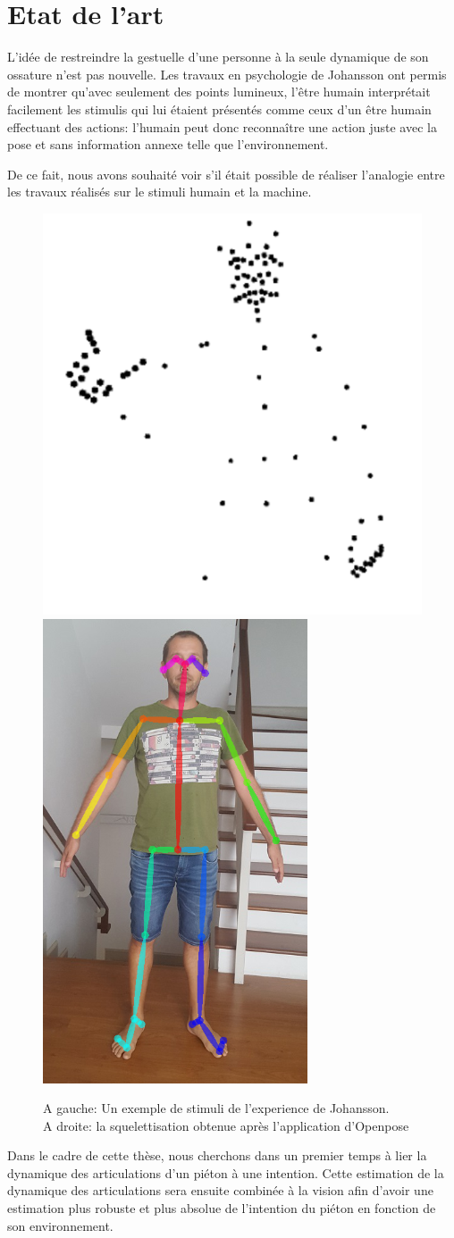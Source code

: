 \chapter{Etat de l'art}
\label{sec:SOTA}

L'idée de restreindre la gestuelle d'une personne à la seule dynamique de son ossature n'est pas nouvelle.
Les travaux en psychologie de Johansson  \cite{johansson1973visual,johansson1976spatio} ont permis de montrer qu'avec seulement des points lumineux, l'être humain interprétait facilement les stimulis qui lui étaient présentés comme ceux d'un être humain effectuant des actions: l'humain peut donc reconnaître une action juste avec la pose et sans information annexe telle que l'environnement. 

De ce fait, nous avons souhaité voir s'il était possible de réaliser l'analogie entre les travaux réalisés sur le stimuli humain et la machine.

\begin{figure}[H]
    \centering
    \includegraphics[width=0.34\linewidth]{Images/Johansson.png}
    \includegraphics[width=0.2\linewidth]{Images/openpose2.png}
    \caption{A gauche: Un exemple de stimuli de l'experience de Johansson.\\ A droite: la squelettisation obtenue après l'application d'Openpose \cite{cao2017realtime}}
    \label{fig:Johansson}
\end{figure}

Dans le cadre de cette thèse, nous cherchons dans un premier temps à lier la dynamique des articulations d'un piéton à une intention. Cette estimation de la dynamique des articulations sera ensuite combinée à la vision afin d’avoir une estimation plus robuste et plus absolue de l'intention du piéton en fonction de son environnement.\\





